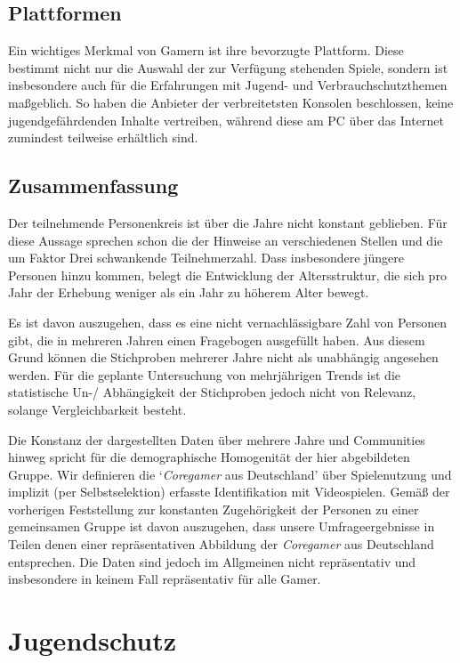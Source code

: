 \documentclass[11pt]{scrartcl}
\begin{document}
\subsection{Plattformen}

Ein wichtiges Merkmal von Gamern ist ihre bevorzugte Plattform.
Diese bestimmt nicht nur die Auswahl der zur Verfügung stehenden Spiele,
sondern ist insbesondere auch für die Erfahrungen mit Jugend- und
Verbrauchschutzthemen maßgeblich.
So haben die Anbieter der verbreitetsten Konsolen beschlossen,
keine jugendgefährdenden Inhalte vertreiben,
während diese am PC über das Internet zumindest teilweise erhältlich sind.




\subsection{Zusammenfassung}

Der teilnehmende Personenkreis ist über die Jahre nicht konstant geblieben.
Für diese Aussage sprechen schon die der Hinweise an verschiedenen Stellen
und die um Faktor Drei schwankende Teilnehmerzahl.
Dass insbesondere jüngere Personen hinzu kommen,
belegt die Entwicklung der Altersstruktur,
die sich pro Jahr der Erhebung weniger als ein Jahr zu höherem Alter bewegt.

Es ist davon auszugehen, dass es eine nicht vernachlässigbare
Zahl von Personen gibt,
die in mehreren Jahren einen Fragebogen ausgefüllt haben.
Aus diesem Grund können die Stichproben mehrerer Jahre
nicht als unabhängig angesehen werden.
Für die geplante Untersuchung von mehrjährigen Trends
ist die statistische Un-/ Abhängigkeit der Stichproben jedoch nicht von Relevanz,
solange Vergleichbarkeit besteht.

Die Konstanz der dargestellten Daten
über mehrere Jahre und Communities hinweg spricht für die
demographische Homogenität der hier abgebildeten Gruppe.
Wir definieren die `\emph{Coregamer} aus Deutschland'
über Spielenutzung und implizit (per Selbstselektion)
erfasste Identifikation mit Videospielen.
Gemäß der vorherigen Feststellung zur konstanten Zugehörigkeit
der Personen zu einer gemeinsamen Gruppe ist davon auszugehen,
dass unsere Umfrageergebnisse in Teilen denen
einer repräsentativen Abbildung der
\emph{Coregamer} aus Deutschland entsprechen.
Die Daten sind jedoch im Allgmeinen nicht repräsentativ
und insbesondere in keinem Fall repräsentativ für alle Gamer.


\section{Jugendschutz}
\end{document}
